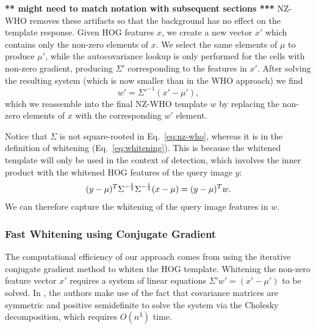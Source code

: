 \documentclass[10pt,twocolumn,letterpaper]{article}
\newcommand{\scream}[1]{{\color{red} \bf *** #1 ***}}
\begin{document}
\scream{might need to match notation with subsequent sections}
NZ-WHO removes these artifacts so that the background has no effect on the template response. Given HOG features $x$, we create a new vector $x'$ which contains only the non-zero elements of $x$. We select the same elements of $\mu$ to produce $\mu'$, while the autocovariance lookup is only performed for the cells with non-zero gradient, producing $\Sigma'$ corresponding to the features in $x'$. After solving the resulting system (which is now smaller than in the WHO approach) we find
\begin{equation}
w'=\Sigma'^{-1}(x' - \mu') \label{eq:nz-who},
\end{equation}which we reassemble into the final NZ-WHO template $w$ by replacing the non-zero elements of $x$ with the corresponding $w'$ element.

Notice that $\Sigma$ is not square-rooted in Eq.~\ref{eq:nz-who}, whereas it is in the definition of whitening (Eq.~\ref{eq:whitening}). This is because the whitened template will only be used in the context of detection, which involves the inner product with the whitened HOG features of the query image $y$:
\begin{equation}
(y-\mu)^{T}\Sigma^{-\frac{1}{2}}\Sigma^{-\frac{1}{2}}(x-\mu)\\
= (y-\mu)^{T} w.
\end{equation}
We can therefore capture the whitening of the query image features in $w$.




\subsubsection{Fast Whitening using Conjugate Gradient}

The computational efficiency of our approach comes from using the iterative conjugate gradient method to whiten the HOG template. Whitening the non-zero feature vector $x'$ requires a system of linear equations $\Sigma' w' = (x' - \mu')$ to be solved. In
\cite{Hariharan12}, the authors make use of the fact that covariance matrices
are symmetric and positive semidefinite to solve the system via the Cholesky
decomposition, which requires $O(n^3)$ time.
\end{document}
